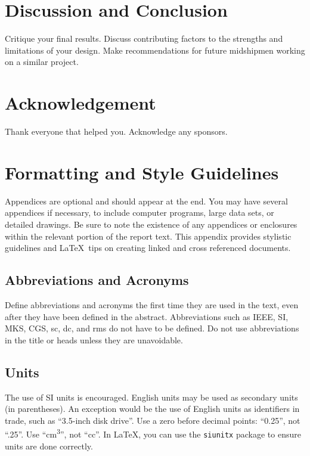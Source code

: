 \documentclass{wsecapstone}
\begin{document}
\section{Discussion and Conclusion}
Critique your final results. Discuss contributing factors to the strengths and limitations of your design. 
Make recommendations for future midshipmen working on a similar project.




\section*{Acknowledgement}
Thank everyone that helped you. Acknowledge any sponsors. 

\nocite{*}





\clearpage
\appendix
\section{Formatting and Style Guidelines}\label{app-style}
Appendices are optional and should appear at the end. You may have several appendices if necessary, to include computer programs, large data sets, or detailed drawings. Be sure to note the existence of any appendices or enclosures within the relevant portion of the report text.  
This appendix provides stylistic guidelines and \LaTeX\ tips on creating linked and cross referenced documents.  

\subsection{Abbreviations and Acronyms}
Define abbreviations and acronyms the first time they are used in the text, even after they have been defined in the abstract. Abbreviations such as IEEE, SI, MKS, CGS, sc, dc, and rms do not have to be defined. Do not use abbreviations in the title or heads unless they are unavoidable.

\subsection{Units}
The use of SI units is encouraged. English units may be used as secondary units (in parentheses). An exception would be the use of English units as identifiers in trade, such as ``3.5-inch disk drive''. Use a zero before decimal points: ``0.25'', not ``.25''. Use ``\si{\centi\meter\cubed}'', not ``cc''. In \LaTeX, you can use the \lstinline{siunitx} package to ensure units are done correctly. 
\end{document}
